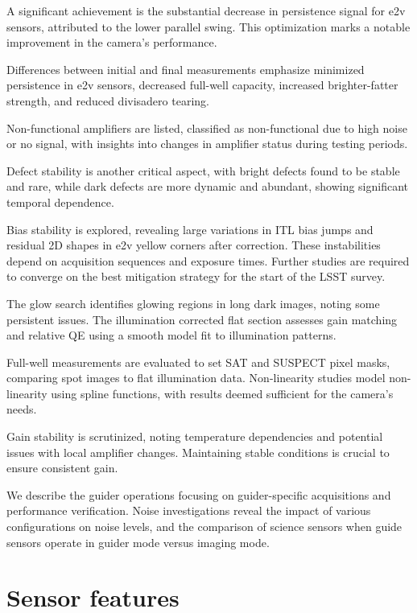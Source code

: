 A significant achievement is the substantial decrease in persistence signal for e2v sensors, attributed to the lower parallel swing. This optimization marks a notable improvement in the camera's performance.

Differences between initial and final measurements emphasize minimized persistence in e2v sensors, decreased full-well capacity, increased brighter-fatter strength, and reduced divisadero tearing.

Non-functional amplifiers are listed, classified as non-functional due to high noise or no signal, with insights into changes in amplifier status during testing periods.

Defect stability is another critical aspect, with bright defects found to be stable and rare, while dark defects are more dynamic and abundant, showing significant temporal dependence.

Bias stability is explored, revealing large variations in ITL bias jumps and residual 2D shapes in e2v yellow corners after correction. These instabilities depend on acquisition sequences and exposure times. Further studies are required to converge on the best mitigation strategy for the start of the LSST survey.

The glow search identifies glowing regions in long dark images, noting some persistent issues. The illumination corrected flat section assesses gain matching and relative QE using a smooth model fit to illumination patterns.

Full-well measurements are evaluated to set SAT and SUSPECT pixel masks, comparing spot images to flat illumination data. Non-linearity studies model non-linearity using spline functions, with results deemed sufficient for the camera's needs.

Gain stability is scrutinized, noting temperature dependencies and potential issues with local amplifier changes. Maintaining stable conditions is crucial to ensure consistent gain.

We describe the guider operations focusing on guider-specific acquisitions and performance verification. Noise investigations reveal the impact of various configurations on noise levels, and the comparison of science sensors when guide sensors operate in guider mode versus imaging mode.


\clearpage
\section{Sensor features}\label{sensor-features}

